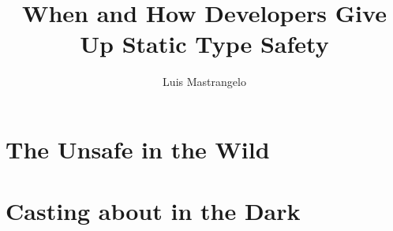 \documentclass[]{usiinfthesis}
\title{When and How \lang{Java} Developers Give Up Static Type Safety} %
\author{Luis Mastrangelo} %
\begin{document}
\ifdefined\UnsafeChapter
  
\else
  \ifdefined\CastsChapter
    
  \else
    \ifdefined\ConclusionsChapter
      \chapter{The \java{} Unsafe \api{} in the Wild}\label{cha:unsafe}
      \chapter{Casting about in the Dark}\label{cha:casts}
      
    \else
      \maketitle
      \frontmatter
      
      
      \tableofcontents 
      \listoffigures
      \listoftables
      \listoflistings
      \mainmatter
      
      
      
      
      
      \appendix
      
      \backmatter
    \fi
  \fi
\fi



\end{document}
